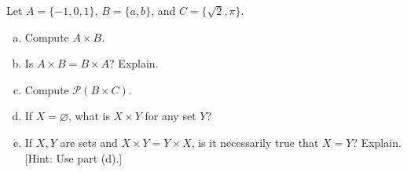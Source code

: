 \documentclass[11pt,letterpaper]{article}
\begin{document}
\newpage



 Let $A= \{ -1, 0, 1 \}$, $B= \{ a, b \}$, and $C= \{ \sqrt{2}, \pi \}$. 
	\begin{enumerate}[(a)]
	\item Compute $A \times B$.
	\item Is $A \times B= B \times A$? Explain. 
	\item Compute $\mathcal{P}(B \times C)$.
	\item If $X= \varnothing$, what is $X \times Y$ for any set $Y$?
	\item If $X, Y$ are sets and $X \times Y= Y \times X$, is it necessarily true that $X= Y$? Explain. [Hint: Use part (d).]
	\end{enumerate} \pspace
\end{document}
